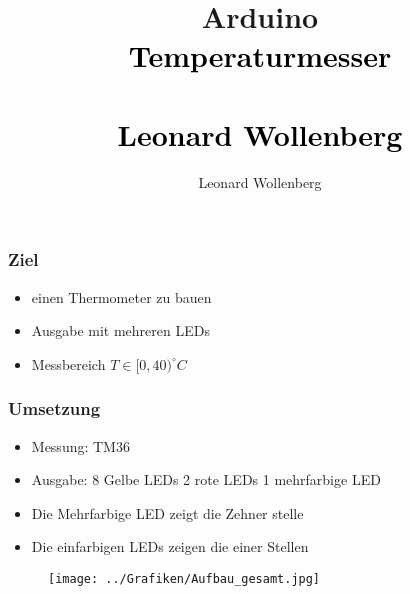 \documentclass[9pt]{beamer}
\title{{\Huge Arduino}\\ \vspace{0.5cm} \textcolor{black}{Temperaturmesser\\ \\Leonard Wollenberg}}
\author{Leonard Wollenberg}
\institute{Praktikum}
\begin{document}
	\begin{frame}
	  \setcounter{framenumber}{0}
	  \titlepage
	\end{frame}
	
	\begin{frame}
		\frametitle{Ziel}
		\begin{itemize}
				\item einen Thermometer zu bauen
				\item Ausgabe mit mehreren LEDs
				\item Messbereich $T\in[0,40)^\circ C$
		\end{itemize}
	\end{frame}

	\begin{frame}
		\frametitle{Umsetzung}
		\begin{itemize}
			\item Messung:  \textrm{TM36}
			\item Ausgabe: 8 Gelbe LEDs 2 rote LEDs 1 mehrfarbige LED
			\item Die Mehrfarbige LED zeigt die Zehner stelle
			\item Die einfarbigen LEDs zeigen die einer Stellen
		\end{itemize}
	\end{frame}

	\begin{frame}
		\begin{figure}
			\texttt{[image: ../Grafiken/Aufbau\_gesamt.jpg]}
		\end{figure}
	\end{frame}
\end{document}
